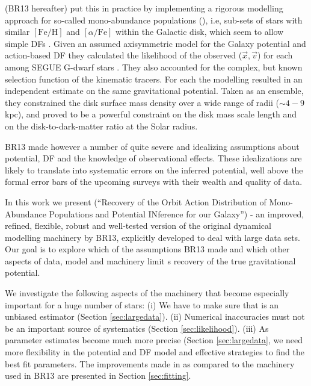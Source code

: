 \citet{2013ApJ...779..115B} (BR13 hereafter) put this in practice by implementing a rigorous modelling approach for so-called mono-abundance populations (\MAPs{}), i.e, sub-sets of stars with similar $[\mathrm{Fe}/\mathrm{H}]$ and $[\alpha/\mathrm{Fe}]$ within the Galactic disk, which seem to allow simple DFs \citep{bov12b,bov12c,2012ApJ...753..148B}. Given an assumed axisymmetric model for the Galaxy potential and action-based DF \citep{2010MNRAS.401.2318B,2011MNRAS.413.1889B,2013MNRAS.434..652T} they calculated the likelihood of the observed ($\vec{x},\vec{v}$) for each \MAP{} among SEGUE G-dwarf stars \citep{2009AJ....137.4377Y}. They also accounted for the complex, but known selection function  of the kinematic tracers. For each \MAP{} the modelling resulted in an independent estimate on the same gravitational potential. Taken as an ensemble, they constrained the disk surface mass density over a wide range of radii ($\sim 4-9$ kpc), and proved to be a powerful constraint on the disk mass scale length and on the disk-to-dark-matter ratio at the Solar radius. 

BR13 made however a number of quite severe and idealizing assumptions about potential, DF and the knowledge of observational effects. These idealizations are likely to translate into systematic errors on the inferred potential, well above the formal error bars of the upcoming surveys with their wealth and quality of data.

In this work we present \RM{} (``\textsc{R}ecovery of the \textsc{O}rbit \textsc{A}ction \textsc{D}istribution of \textsc{M}ono-\textsc{A}bundance \textsc{P}opulations and \textsc{P}otential \textsc{IN}ference for our \textsc{G}alaxy'') - an improved, refined, flexible, robust and well-tested version of the original dynamical modelling machinery by BR13, explicitly developed to deal with large data sets. Our goal is to explore which of the assumptions BR13 made and which other aspects of data, model and machinery limit \RM{}s recovery of the true gravitational potential.

We investigate the following aspects of the \RM{} machinery that become especially important for a huge number of stars: (i) We have to make sure that \RM{} is an unbiased estimator (Section \ref{sec:largedata}). (ii) Numerical inaccuracies must not be an important source of systematics (Section \ref{sec:likelihood}). (iii) As parameter estimates become much more precise (Section \ref{sec:largedata}, we need more flexibility in the potential and DF model and effective strategies to find the best fit parameters. The improvements made in \RM{} as compared to the machinery used in BR13 are presented in Section \ref{sec:fitting}.

